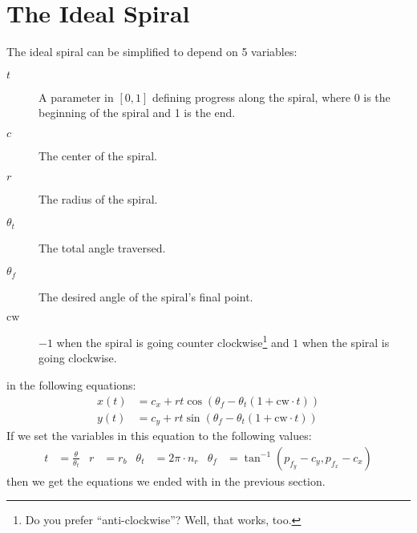 \documentclass{article}
\begin{document}
\section{The Ideal Spiral}

The ideal spiral can be simplified to depend on 5 variables:
\begin{description}
  \item[$t$] A parameter in $[0,1]$ defining progress along the spiral, where 0 is the beginning of the spiral and 1 is the end.
  \item[$c$] The center of the spiral.
  \item[$r$] The radius of the spiral.
  \item[$\theta_t$] The total angle traversed.
  \item[$\theta_f$] The desired angle of the spiral's final point.
  \item[$\mathrm{cw}$] $-1$ when the spiral is going counter clockwise\footnote{Do you prefer ``anti-clockwise''?  Well, that works, too.} and $1$ when the spiral is going clockwise.
\end{description}
in the following equations:
\begin{align*}
  x(t) &= c_x+rt\cos\left(\theta_f-\theta_t(1+\textrm{cw}\cdot t)\right) \\
  y(t) &= c_y+rt\sin\left(\theta_f-\theta_t(1+\textrm{cw}\cdot t)\right)
\end{align*}
If we set the variables in this equation to the following values:
\begin{align*}
  t &= \frac{\theta}{\theta_t} & r &= r_b & \theta_t &= 2\pi\cdot n_r & \theta_f &= \tan^{-1}(p_{f_y}-c_y,p_{f_x}-c_x)
\end{align*}
then we get the equations we ended with in the previous section.
\end{document}
